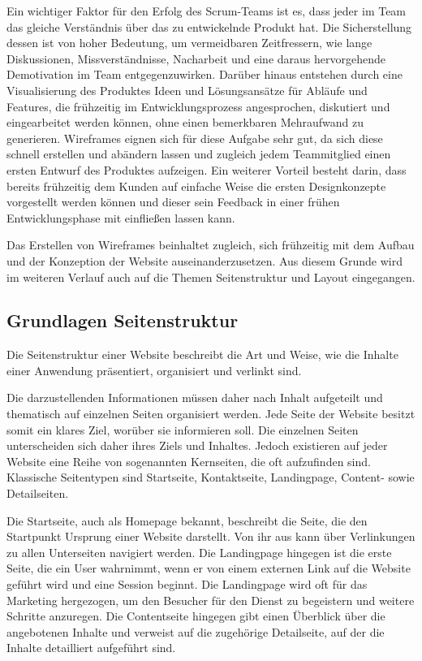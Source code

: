 
Ein wichtiger Faktor für den Erfolg des Scrum-Teams ist es, dass jeder im Team das gleiche Verständnis über das zu entwickelnde Produkt hat. Die Sicherstellung dessen ist von hoher Bedeutung, um vermeidbaren Zeitfressern, wie lange Diskussionen, Missverständnisse, Nacharbeit und eine \ggf daraus hervorgehende Demotivation im Team entgegenzuwirken.
Darüber hinaus entstehen durch eine Visualisierung des Produktes Ideen und Lösungsansätze für Abläufe und Features, die frühzeitig im Entwicklungsprozess angesprochen, diskutiert und eingearbeitet werden können, ohne einen bemerkbaren Mehraufwand zu generieren.
Wireframes eignen sich für diese Aufgabe sehr gut, da sich diese schnell erstellen und abändern lassen und zugleich jedem Teammitglied einen ersten Entwurf des Produktes aufzeigen. Ein weiterer Vorteil besteht darin, dass bereits frühzeitig dem Kunden auf einfache Weise die ersten Designkonzepte vorgestellt werden können und dieser sein Feedback in einer frühen Entwicklungsphase mit einfließen lassen kann.

Das Erstellen von Wireframes beinhaltet zugleich, sich frühzeitig mit dem Aufbau und der Konzeption der Website auseinanderzusetzen. Aus diesem Grunde wird im weiteren Verlauf auch auf die Themen Seitenstruktur und Layout eingegangen.

\subsection{Grundlagen Seitenstruktur}

Die Seitenstruktur einer Website beschreibt die Art und Weise, wie die Inhalte einer Anwendung präsentiert, organisiert und verlinkt sind.

Die darzustellenden Informationen müssen daher nach Inhalt aufgeteilt und thematisch auf einzelnen Seiten organisiert werden. Jede Seite der Website besitzt somit ein klares Ziel, worüber sie informieren soll. Die einzelnen Seiten unterscheiden sich daher \bzgl ihres Ziels und Inhaltes. Jedoch existieren auf jeder Website eine Reihe von sogenannten Kernseiten, die oft aufzufinden sind. Klassische Seitentypen sind \bspw Startseite, Kontaktseite, Landingpage, Content- sowie Detailseiten.

Die Startseite, auch als Homepage bekannt, beschreibt die Seite, die den Startpunkt \bzw Ursprung einer Website darstellt. Von ihr aus kann über Verlinkungen zu allen Unterseiten navigiert werden.
Die Landingpage hingegen ist die erste Seite, die ein User wahrnimmt, wenn er von einem externen Link auf die Website geführt wird und eine Session beginnt. Die Landingpage wird oft für das Marketing hergezogen, um den Besucher für den Dienst zu begeistern und weitere Schritte anzuregen.
Die Contentseite hingegen gibt einen Überblick über die angebotenen Inhalte und verweist auf die zugehörige Detailseite, auf der die Inhalte detailliert aufgeführt sind.

